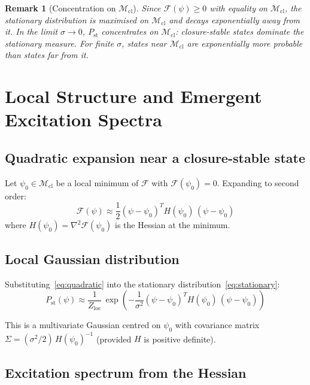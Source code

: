 \documentclass[12pt]{article}
\newtheorem{remark}[theorem]{Remark}
\newcommand{\Mcl}{\mathcal{M}_{\mathrm{cl}}}
\newcommand{\Fcal}{\mathcal{F}}
\begin{document}
\begin{remark}[Concentration on $\Mcl$]
Since $\Fcal(\psi) \geq 0$ with equality on $\Mcl$, the stationary distribution is maximised on $\Mcl$ and decays exponentially away from it. In the limit $\sigma \to 0$, $P_{\mathrm{st}}$ concentrates on $\Mcl$: closure-stable states dominate the stationary measure. For finite $\sigma$, states near $\Mcl$ are exponentially more probable than states far from it.
\end{remark}

\section{Local Structure and Emergent Excitation Spectra}\label{sec:local}

\subsection{Quadratic expansion near a closure-stable state}

Let $\psi_0 \in \Mcl$ be a local minimum of $\Fcal$ with $\Fcal(\psi_0) = 0$. Expanding to second order:
\begin{equation}\label{eq:quadratic}
    \Fcal(\psi) \approx \frac{1}{2}(\psi - \psi_0)^T H(\psi_0)\, (\psi - \psi_0)
\end{equation}
where $H(\psi_0) = \nabla^2\Fcal(\psi_0)$ is the Hessian at the minimum.

\subsection{Local Gaussian distribution}

Substituting~\eqref{eq:quadratic} into the stationary distribution~\eqref{eq:stationary}:
\begin{equation}\label{eq:gaussian}
    P_{\mathrm{st}}(\psi) \approx \frac{1}{Z_{\mathrm{loc}}}\, \exp\!\left(-\frac{1}{\sigma^2}(\psi - \psi_0)^T H(\psi_0)\, (\psi - \psi_0)\right)
\end{equation}

This is a multivariate Gaussian centred on $\psi_0$ with covariance matrix $\Sigma = (\sigma^2/2)\, H(\psi_0)^{-1}$ (provided $H$ is positive definite).

\subsection{Excitation spectrum from the Hessian}
\end{document}
